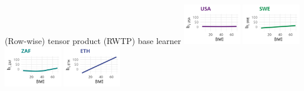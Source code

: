 \documentclass[t,10pt]{beamer}
\begin{document}
\begin{frame}{(Row-wise) tensor product (RWTP) base learner}
  {\includegraphics[width=0.19\textwidth]{figures/bs-tensor/fig-tensor-USA.png}}
  {\includegraphics[width=0.19\textwidth]{figures/bs-tensor/fig-tensor-SWE.png}}
  \includegraphics[width=0.19\textwidth]{figures/bs-tensor/fig-tensor-ZAF.png}
  {\includegraphics[width=0.19\textwidth]{figures/bs-tensor/fig-tensor-ETH.png}}
  \addtocounter{framenumber}{-1}
\end{frame}
\end{document}
